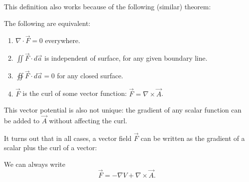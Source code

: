 This definition also works because of the following (similar) theorem:
\begin{theorem}
    The following are equivalent:
    \begin{enumerate}[(1)]
        \item $\nabla\cdot\vec{F}=0$ everywhere.
        \item $\iint \vec{F}\cdot d\vec{a}$ is independent of surface, for any given boundary line.
        \item $\oiint \vec{F}\cdot d\vec{a}=0$ for any closed surface.
        \item $\vec{F}$ is the curl of some vector function: $\vec{F}=\nabla\times\vec{A}$.
    \end{enumerate}
\end{theorem}

This vector potential is also not unique: the gradient of any scalar function can be added to $\vec{A}$ without affecting the curl.

It turns out that in all cases, a vector field $\vec{F}$ can be written as the gradient of a scalar plus the curl of a vector:
\begin{moral}
We can always write
\[\vec{F}=-\nabla V+\nabla\times\vec{A}.\]
\end{moral}

